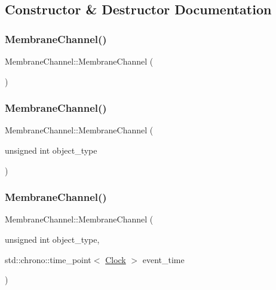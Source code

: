 \subsection{Constructor \& Destructor Documentation}
\mbox{\label{classMembraneChannel_acbc07cd5836394396b0c1944f43350d6}} 
\subsubsection{\texorpdfstring{Membrane\+Channel()}{MembraneChannel()}\hspace{0.1cm}{\footnotesize\ttfamily [1/4]}}
{\footnotesize\ttfamily Membrane\+Channel\+::\+Membrane\+Channel (\begin{DoxyParamCaption}{ }\end{DoxyParamCaption})\hspace{0.3cm}{\ttfamily [inline]}}

\mbox{\label{classMembraneChannel_a17cdd2064bebb7bd2568cf5ec92715fc}} 
\subsubsection{\texorpdfstring{Membrane\+Channel()}{MembraneChannel()}\hspace{0.1cm}{\footnotesize\ttfamily [2/4]}}
{\footnotesize\ttfamily Membrane\+Channel\+::\+Membrane\+Channel (\begin{DoxyParamCaption}\item[{unsigned int}]{object\+\_\+type }\end{DoxyParamCaption})\hspace{0.3cm}{\ttfamily [inline]}}

\mbox{\label{classMembraneChannel_aedc9eb52da9e7160850f552781df27b6}} 
\subsubsection{\texorpdfstring{Membrane\+Channel()}{MembraneChannel()}\hspace{0.1cm}{\footnotesize\ttfamily [3/4]}}
{\footnotesize\ttfamily Membrane\+Channel\+::\+Membrane\+Channel (\begin{DoxyParamCaption}\item[{unsigned int}]{object\+\_\+type,  }\item[{std\+::chrono\+::time\+\_\+point$<$ \mbox{\hyperlink{universe_8h_a0ef8d951d1ca5ab3cfaf7ab4c7a6fd80}{Clock}} $>$}]{event\+\_\+time }\end{DoxyParamCaption})\hspace{0.3cm}{\ttfamily [inline]}}

